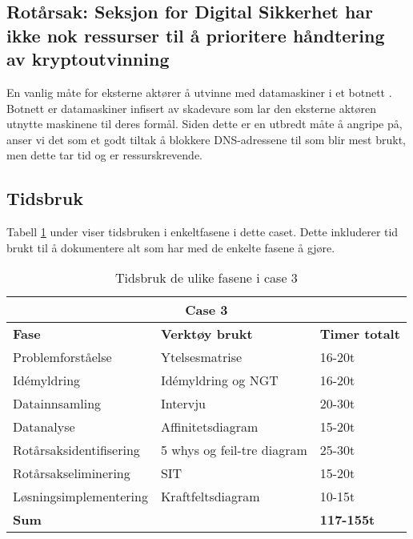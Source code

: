 \subsection*{Rotårsak: Seksjon for Digital Sikkerhet har ikke nok ressurser til å prioritere håndtering av kryptoutvinning}
En vanlig måte for eksterne aktører å utvinne med datamaskiner i et botnett \cite{Botnet}. Botnett er datamaskiner infisert av skadevare som lar den eksterne aktøren utnytte maskinene til deres formål. Siden dette er en utbredt måte å angripe på, anser vi det som et godt tiltak å blokkere DNS-adressene til som blir mest brukt, men dette tar tid og er ressurskrevende.

\subsection{Tidsbruk}
\label{tidsbruk_case_3}
Tabell \ref{tab:tidsbruk_case3} under viser tidsbruken i enkeltfasene i dette caset. Dette inkluderer tid brukt til å dokumentere alt som har med de enkelte fasene å gjøre. 

\begin{table}[H]
  \centering
  \caption{Tidsbruk de ulike fasene i case 3}
    \begin{tabular}{|lr|l|}
    \hline
    \multicolumn{3}{|c|}{\cellcolor{yellow}\textbf{Case 3}} \\
    \hline
    \multicolumn{1}{|l|}{\cellcolor{apricot}\textbf{Fase}} & \multicolumn{1}{l|}{\cellcolor{apricot}\textbf{Verktøy brukt}} & \cellcolor{apricot}\textbf{Timer totalt} \\
    \hline
    \multicolumn{1}{|l|}{Problemforståelse} & \multicolumn{1}{l|}{Ytelsesmatrise} & 16-20t \\
    \hline
    \multicolumn{1}{|l|}{Idémyldring} & \multicolumn{1}{l|}{Idémyldring og NGT} & 16-20t \\
    \hline
    \multicolumn{1}{|l|}{Datainnsamling} & \multicolumn{1}{l|}{Intervju} & 20-30t \\
    \hline
    \multicolumn{1}{|l|}{Datanalyse} & \multicolumn{1}{l|}{Affinitetsdiagram} & 15-20t \\
    \hline
    \multicolumn{1}{|l|}{Rotårsaksidentifisering} & \multicolumn{1}{l|}{5 whys og feil-tre diagram} & 25-30t \\
    \hline
    \multicolumn{1}{|l|}{Rotårsakseliminering} & \multicolumn{1}{l|}{SIT} & 15-20t \\
    \hline
    \multicolumn{1}{|l|}{Løsningsimplementering} & \multicolumn{1}{l|}{Kraftfeltsdiagram} & 10-15t \\
    \hline
    \multicolumn{2}{|l|}{\textbf{Sum}} & \textbf{117-155t} \\
    \hline
    \end{tabular}%
  \label{tab:tidsbruk_case3}%
\end{table}%


